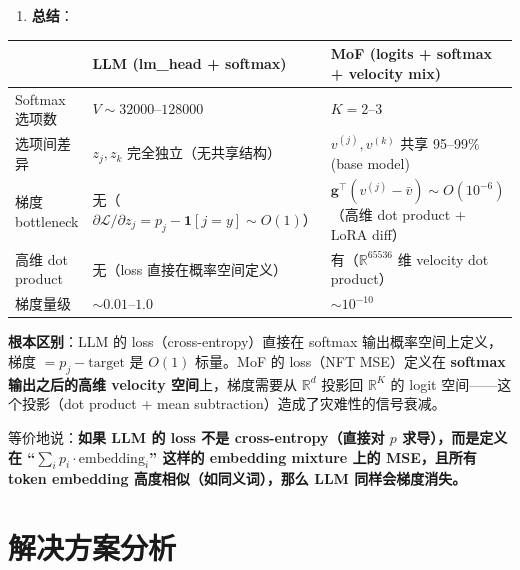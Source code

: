 \documentclass[11pt,a4paper]{article}
\newcommand{\loss}{\mathcal{L}}
\newcommand{\R}{\mathbb{R}}
\theoremstyle{definition}
\begin{document}
\begin{tcolorbox}[colback=blue!5, colframe=blue!50!black, title=对比：LLM Head (Softmax) vs MoF (Softmax)]
\begin{enumerate}[leftmargin=1.5em]
MoF 中 softmax 作用于 \textbf{$K$ 个 teacher 的权重}（仅 2--3 个），然后乘以 $d = 65536$ 维的 teacher velocity，梯度需要通过 $\R^d$ 空间的 dot product 传递——方向对齐性 $\sim 1/\sqrt{d}$ 导致信号大量 cancellation。

\item \textbf{总结}：
\end{enumerate}

\begin{center}
\renewcommand{\arraystretch}{1.5}
\begin{tabular}{@{}p{3cm}p{5.5cm}p{5.5cm}@{}}
\toprule
& \textbf{LLM (lm\_head + softmax)} & \textbf{MoF (logits + softmax + velocity mix)} \\
\midrule
Softmax 选项数 & $V \sim 32000$--$128000$ & $K = 2$--$3$ \\
选项间差异 & $z_j, z_k$ 完全独立（无共享结构） & $v^{(j)}, v^{(k)}$ 共享 95--99\% (base model) \\
梯度 bottleneck & 无（$\partial\loss/\partial z_j = p_j - \mathbf{1}[j=y] \sim O(1)$） & $\mathbf{g}^\top(v^{(j)} - \bar{v}) \sim O(10^{-6})$（高维 dot product + LoRA diff） \\
高维 dot product & 无（loss 直接在概率空间定义） & 有（$\R^{65536}$ 维 velocity dot product） \\
梯度量级 & $\sim 0.01$--$1.0$ & $\sim 10^{-10}$ \\
\bottomrule
\end{tabular}
\end{center}

\textbf{根本区别}：LLM 的 loss（cross-entropy）直接在 softmax 输出概率空间上定义，梯度 $= p_j - \text{target}$ 是 $O(1)$ 标量。MoF 的 loss（NFT MSE）定义在 \textbf{softmax 输出之后的高维 velocity 空间}上，梯度需要从 $\R^d$ 投影回 $\R^K$ 的 logit 空间——这个投影（dot product + mean subtraction）造成了灾难性的信号衰减。

等价地说：\textbf{如果 LLM 的 loss 不是 cross-entropy（直接对 $p$ 求导），而是定义在 ``$\sum_i p_i \cdot \text{embedding}_i$'' 这样的 embedding mixture 上的 MSE，且所有 token embedding 高度相似（如同义词），那么 LLM 同样会梯度消失。}
\end{tcolorbox}

\section{解决方案分析}
\label{sec:solutions}
\end{document}
